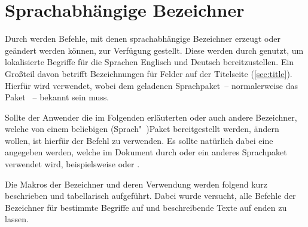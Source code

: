 \section{Sprachabhängige Bezeichner}
\label{sec:localization}
%
%
Durch \KOMAScript{} werden Befehle, mit denen sprachabhängige Bezeichner 
erzeugt oder geändert werden können, zur Verfügung gestellt. Diese werden durch 
\TUDScript genutzt, um lokalisierte Begriffe für die Sprachen Englisch und 
Deutsch bereitzustellen. Ein Großteil davon betrifft Bezeichnungen für Felder 
auf der Titelseite (\autoref{sec:title}). Hierfür wird
verwendet, wobei  dem geladenen Sprachpaket~-- normalerweise das 
Paket ~-- bekannt sein muss.

Sollte der Anwender die im Folgenden erläuterten oder auch andere Bezeichner, 
welche von einem beliebigen (Sprach"~)Paket bereitgestellt werden, ändern 
wollen, ist hierfür der Befehl
zu verwenden. Es sollte natürlich dabei eine  angegeben werden, 
welche im Dokument durch  oder ein anderes Sprachpaket verwendet 
wird, beispielsweise  oder . 

Die Makros der Bezeichner und deren Verwendung werden folgend kurz beschrieben 
und tabellarisch aufgeführt. Dabei wurde versucht, alle Befehle der Bezeichner 
für bestimmte Begriffe auf  und beschreibende Texte auf 
 enden zu lassen.

